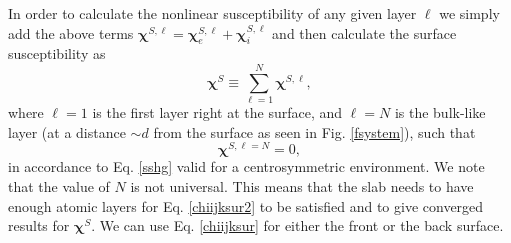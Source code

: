 In order to calculate the nonlinear susceptibility of any given layer 
$\ell$ we simply add the above terms $\boldsymbol{\chi}^{S,\ell}=
\boldsymbol{\chi}_e^{S,\ell}+\boldsymbol{\chi}_i^{S,\ell}$ and 
then calculate the surface susceptibility as 
\begin{equation}\label{chiijksur}
\boldsymbol{\chi}^S\equiv \sum_{\ell=1}^{N}\boldsymbol{\chi}^{S,\ell},
\end{equation} 
where $\ell=1$ is the first layer right at the surface, 
and $\ell=N$ is the bulk-like layer (at a distance $\sim d$ from the
surface  as seen in
Fig. \ref{fsystem}), such that 
\begin{equation}\label{chiijksur2}
\boldsymbol{\chi}^{S,\ell=N}=0,
\end{equation}
in accordance to Eq. \eqref{sshg} valid for a centrosymmetric environment. 
We note that the value of
$N$ is not universal.
This means that the slab needs to have enough atomic layers for 
Eq. \eqref{chiijksur2} 
to be satisfied and to give converged results for $\boldsymbol{\chi}^S$. 
We can use Eq. \eqref{chiijksur} for
either the front or the back surface.


